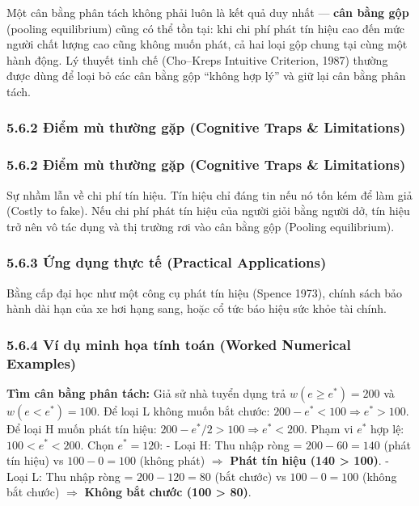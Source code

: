 \documentclass[
]{article}
\begin{document}
Một cân bằng phân tách không phải luôn là kết quả duy nhất ---
\textbf{cân bằng gộp} (pooling equilibrium) cũng có thể tồn tại: khi chi
phí phát tín hiệu cao đến mức người chất lượng cao cũng không muốn phát,
cả hai loại gộp chung tại cùng một hành động. Lý thuyết tinh chế
(Cho--Kreps Intuitive Criterion, 1987) thường được dùng để loại bỏ các
cân bằng gộp ``không hợp lý'' và giữ lại cân bằng phân tách.

\subsubsection{5.6.2 Điểm mù thường gặp (Cognitive Traps \&
Limitations)}\label{ux111iux1ec3m-muxf9-thux1b0ux1eddng-gux1eb7p-cognitive-traps-limitations-11}

\subsubsection{5.6.2 Điểm mù thường gặp (Cognitive Traps \&
Limitations)}\label{ux111iux1ec3m-muxf9-thux1b0ux1eddng-gux1eb7p-cognitive-traps-limitations-12}

Sự nhầm lẫn về chi phí tín hiệu. Tín hiệu chỉ đáng tin nếu nó tốn kém để
làm giả (Costly to fake). Nếu chi phí phát tín hiệu của người giỏi bằng
người dở, tín hiệu trở nên vô tác dụng và thị trường rơi vào cân bằng
gộp (Pooling equilibrium).

\subsubsection{5.6.3 Ứng dụng thực tế (Practical
Applications)}\label{ux1ee9ng-dux1ee5ng-thux1ef1c-tux1ebf-practical-applications-7}

Bằng cấp đại học như một công cụ phát tín hiệu (Spence 1973), chính sách
bảo hành dài hạn của xe hơi hạng sang, hoặc cổ tức báo hiệu sức khỏe tài
chính.

\subsubsection{5.6.4 Ví dụ minh họa tính toán (Worked Numerical
Examples)}\label{vuxed-dux1ee5-minh-hux1ecda-tuxednh-touxe1n-worked-numerical-examples-6}

\textbf{Tìm cân bằng phân tách:} Giả sử nhà tuyển dụng trả
\(w(e \ge e^*) = 200\) và \(w(e < e^*) = 100\). Để loại L không muốn bắt
chước: \(200 - e^* < 100 \Rightarrow e^* > 100\). Để loại H muốn phát
tín hiệu: \(200 - e^*/2 > 100 \Rightarrow e^* < 200\). Phạm vi \(e^*\)
hợp lệ: \(100 < e^* < 200\). Chọn \(e^* = 120\): - Loại H: Thu nhập ròng
= \(200 - 60 = 140\) (phát tín hiệu) vs \(100 - 0 = 100\) (không phát)
\(\Rightarrow\) \textbf{Phát tín hiệu (140 \textgreater{} 100)}. - Loại
L: Thu nhập ròng = \(200 - 120 = 80\) (bắt chước) vs \(100 - 0 = 100\)
(không bắt chước) \(\Rightarrow\) \textbf{Không bắt chước (100
\textgreater{} 80)}.
\end{document}
